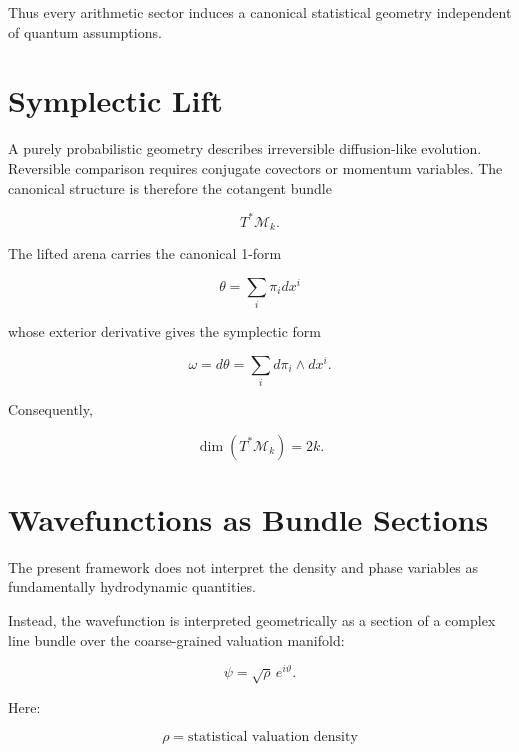 \documentclass[11pt]{article}
\begin{document}
Thus every arithmetic sector induces a canonical statistical geometry independent of quantum assumptions.

\section{Symplectic Lift}

A purely probabilistic geometry describes irreversible diffusion-like evolution. Reversible comparison requires conjugate covectors or momentum variables. The canonical structure is therefore the cotangent bundle

\begin{equation}
T^*\mathcal{M}_k.
\end{equation}

The lifted arena carries the canonical 1-form

\begin{equation}
\theta = \sum_i \pi_i dx^i
\end{equation}

whose exterior derivative gives the symplectic form

\begin{equation}
\omega = d\theta
= \sum_i d\pi_i \wedge dx^i.
\end{equation}

Consequently,

\begin{equation}
\dim(T^*\mathcal{M}_k)=2k.
\end{equation}

\section{Wavefunctions as Bundle Sections}

The present framework does not interpret the density and phase variables as fundamentally hydrodynamic quantities.

Instead, the wavefunction is interpreted geometrically as a section of a complex line bundle over the coarse-grained valuation manifold:

\begin{equation}
\psi = \sqrt{\rho}\, e^{i\vartheta}.
\end{equation}

Here:

\begin{equation}
\rho = \text{statistical valuation density}
\end{equation}
\end{document}
